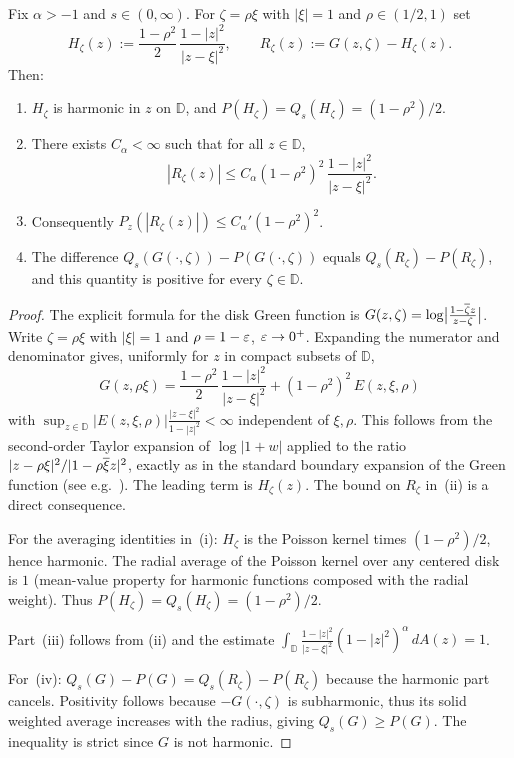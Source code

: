 \documentclass[a4paper,10pt]{amsart}
\newcommand{\D}{\mathbb{D}}
\begin{document}
\begin{numlemma}\label{lem:green-boundary-expansion}
Fix $\alpha>-1$ and $s\in(0,\infty)$.  For $\zeta=\rho\xi$ with
$|\xi|=1$ and $\rho\in(1/2,1)$ set
\[
H_\zeta(z):=\frac{1-\rho^2}{2}\,\frac{1-|z|^2}{|z-\xi|^2},
\qquad
R_\zeta(z):=G(z,\zeta)-H_\zeta(z).
\]
Then:
\begin{enumerate}[label=(\roman*)]
\item $H_\zeta$ is harmonic in $z$ on $\D$, and
$P(H_\zeta)=Q_s(H_\zeta)=(1-\rho^2)/2$.
\item There exists $C_{\alpha}<\infty$ such that for all
$z\in\D$,
\[
|R_\zeta(z)|
\le
C_{\alpha}(1-\rho^2)^2\,
\frac{1-|z|^2}{|z-\xi|^2}.
\]
\item Consequently
$P_z(|R_\zeta(z)|)\le C_{\alpha}'(1-\rho^2)^2$.
\item The difference $Q_s(G(\cdot,\zeta))-P(G(\cdot,\zeta))$ equals
$Q_s(R_\zeta)-P(R_\zeta)$, and this quantity is positive for every
$\zeta\in\D$.
\end{enumerate}
\end{numlemma}

\begin{proof}
The explicit formula for the disk Green function is
$G(z,\zeta)=\log\bigl|\frac{1-\overline{\zeta} z}{z-\zeta}\bigr|$.
Write $\zeta=\rho\xi$ with $|\xi|=1$ and $\rho=1-\varepsilon$,
$\varepsilon\to0^+$.  Expanding the numerator and denominator gives, uniformly
for $z$ in compact subsets of $\D$,
\[
G(z,\rho\xi)
=
\frac{1-\rho^2}{2}\,
\frac{1-|z|^2}{|z-\xi|^2}
+
(1-\rho^2)^2\,E(z,\xi,\rho)
\]
with $\sup_{z\in\D}|E(z,\xi,\rho)|\frac{|z-\xi|^2}{1-|z|^2}<\infty$
independent of $\xi,\rho$.  This follows from the second-order Taylor
expansion of $\log|1+w|$ applied to the ratio
$|z-\rho\xi|^2/|1-\rho\overline{\xi} z|^2$, exactly as in the standard boundary
expansion of the Green function (see e.g.\ \cite[Lemma~3.4]{kalajramos2024}).
The leading term is $H_\zeta(z)$.  The bound on $R_\zeta$ in~(ii) is a direct
consequence.

For the averaging identities in~(i): $H_\zeta$ is the Poisson kernel times
$(1-\rho^2)/2$, hence harmonic.  The radial average of the Poisson kernel
over any centered disk is $1$ (mean-value property for harmonic functions
composed with the radial weight).  Thus
$P(H_\zeta)=Q_s(H_\zeta)=(1-\rho^2)/2$.

Part~(iii) follows from (ii) and the estimate
$\int_\D\frac{1-|z|^2}{|z-\xi|^2}(1-|z|^2)^\alpha\,dA(z)=1$.

For~(iv): $Q_s(G)-P(G)=Q_s(R_\zeta)-P(R_\zeta)$ because the harmonic part
cancels.  Positivity follows because $-G(\cdot,\zeta)$ is subharmonic, thus
its solid weighted average increases with the radius, giving
$Q_s(G)\ge P(G)$.  The inequality is strict since $G$ is not harmonic.
\end{proof}
\end{document}
